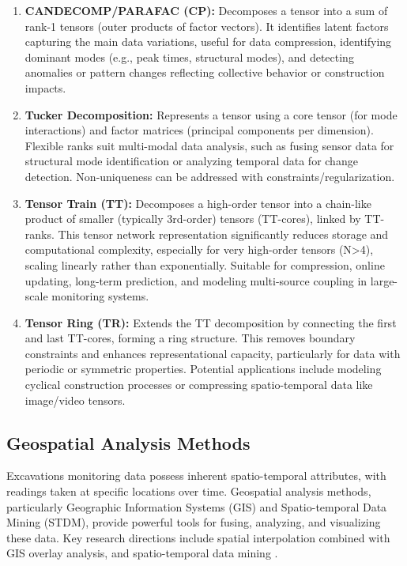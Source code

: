 \documentclass[preprint,11pt,authoryear,3p]{elsarticle}
\begin{document}
\begin{enumerate}
    \item \textbf{CANDECOMP/PARAFAC (CP):} Decomposes a tensor into a sum of rank-1 tensors (outer products of factor vectors). It identifies latent factors capturing the main data variations, useful for data compression, identifying dominant modes (e.g., peak times, structural modes), and detecting anomalies or pattern changes reflecting collective behavior or construction impacts.

    \item \textbf{Tucker Decomposition:} Represents a tensor using a core tensor (for mode interactions) and factor matrices (principal components per dimension). Flexible ranks suit multi-modal data analysis, such as fusing sensor data for structural mode identification or analyzing temporal data for change detection. Non-uniqueness can be addressed with constraints/regularization.

    \item \textbf{Tensor Train (TT):} Decomposes a high-order tensor into a chain-like product of smaller (typically 3rd-order) tensors (TT-cores), linked by TT-ranks. This tensor network representation significantly reduces storage and computational complexity, especially for very high-order tensors (N>4), scaling linearly rather than exponentially. Suitable for compression, online updating, long-term prediction, and modeling multi-source coupling in large-scale monitoring systems.

    \item \textbf{Tensor Ring (TR):} Extends the TT decomposition by connecting the first and last TT-cores, forming a ring structure. This removes boundary constraints and enhances representational capacity, particularly for data with periodic or symmetric properties. Potential applications include modeling cyclical construction processes or compressing spatio-temporal data like image/video tensors.
\end{enumerate}

\subsection{Geospatial Analysis Methods}

Excavations monitoring data possess inherent spatio-temporal attributes, with readings taken at specific locations over time. Geospatial analysis methods, particularly Geographic Information Systems (GIS) and Spatio-temporal Data Mining (STDM), provide powerful tools for fusing, analyzing, and visualizing these data. Key research directions include spatial interpolation combined with GIS overlay analysis, and spatio-temporal data mining \citep{WANG201941}.
\end{document}
